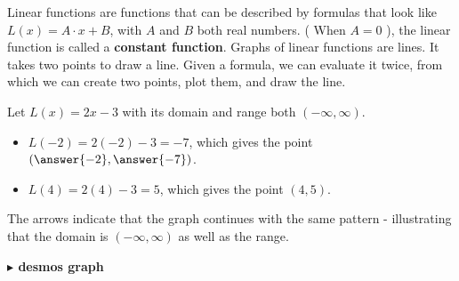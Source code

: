 \documentclass{ximera}
\begin{document}
\begin{example}

Linear functions are functions that can be described by formulas that look like $L(x) = A \cdot x + B$, with $A$ and $B$ both real numbers. ( When $A = 0$ ), the linear function is called a \textbf{constant function}.   Graphs of linear functions are lines.  It takes two points to draw a line. Given a formula, we can evaluate it twice, from which we can create two points, plot them, and draw the line.

Let $L(x) = 2x-3$ with its domain and range both $(-\infty, \infty)$.

\begin{itemize}
\item $L(-2) = 2(-2) - 3 = -7$, which gives the point $\left(\answer{-2}, \answer{-7}\right)$.
\item $L(4) = 2(4) - 3 = 5$, which gives the point $(4, 5)$.
\end{itemize}






\begin{image}
\end{image}

The arrows indicate that the graph continues with the same pattern - illustrating that the domain is $(-\infty, \infty)$ as well as the range.






\begin{onlineOnly}
\textbf{\textcolor{blue!55!black}{$\blacktriangleright$ desmos graph}} 
\begin{center}
\end{center}
\end{onlineOnly}



\end{example}
\end{document}
